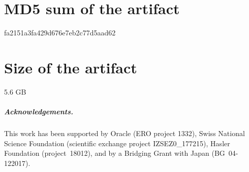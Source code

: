 \documentclass[a4paper,english]{darts-v2019}
\newcommand{\mdsum}[1]{{\section{MD5 sum of the artifact}#1}}
\newcommand{\artifactsize}[1]{{\section{Size of the artifact}#1}}
\begin{document}
\mdsum{fa2151a3fa429d676e7eb2c77d5aad62}

\artifactsize{5.6 GB}

\subparagraph*{Acknowledgements.}
This work has been supported by Oracle (ERO project 1332), Swiss National Science Foundation (scientific exchange project IZSEZ0\_177215), Hasler Foundation (project~18012), and by a Bridging Grant with Japan (BG~04-122017).






\end{document}
